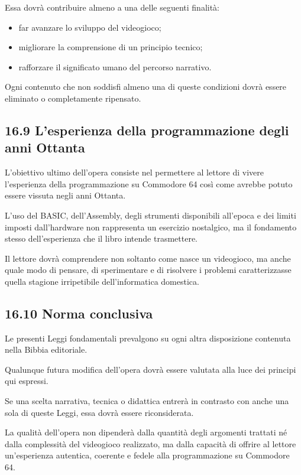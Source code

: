 \documentclass{article}
\begin{document}
Essa dovrà contribuire almeno a una delle seguenti finalità:

\begin{itemize}
\item far avanzare lo sviluppo del videogioco;
\item migliorare la comprensione di un principio tecnico;
\item rafforzare il significato umano del percorso narrativo.
\end{itemize}
Ogni contenuto che non soddisfi almeno una di queste condizioni dovrà essere eliminato o completamente ripensato.

\subsection[16.9 L{}'esperienza della programmazione degli anni Ottanta]{16.9 L'esperienza della programmazione degli
anni Ottanta}
L'obiettivo ultimo dell'opera consiste nel permettere al lettore di vivere l'esperienza della programmazione su
Commodore 64 così come avrebbe potuto essere vissuta negli anni Ottanta.

L'uso del BASIC, dell'Assembly, degli strumenti disponibili all'epoca e dei limiti imposti dall'hardware non rappresenta
un esercizio nostalgico, ma il fondamento stesso dell'esperienza che il libro intende trasmettere.

Il lettore dovrà comprendere non soltanto come nasce un videogioco, ma anche quale modo di pensare, di sperimentare e di
risolvere i problemi caratterizzasse quella stagione irripetibile dell'informatica domestica.

\subsection{16.10 Norma conclusiva}
Le presenti Leggi fondamentali prevalgono su ogni altra disposizione contenuta nella Bibbia editoriale.

Qualunque futura modifica dell'opera dovrà essere valutata alla luce dei principi qui espressi.

Se una scelta narrativa, tecnica o didattica entrerà in contrasto con anche una sola di queste Leggi, essa dovrà essere
riconsiderata.

La qualità dell'opera non dipenderà dalla quantità degli argomenti trattati né dalla complessità del videogioco
realizzato, ma dalla capacità di offrire al lettore un'esperienza autentica, coerente e fedele alla programmazione su
Commodore 64.


\bigskip
\end{document}
